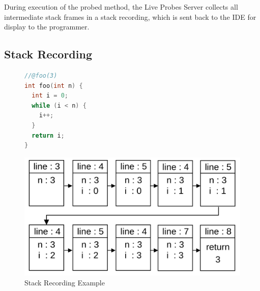 \documentclass[english,submission]{programming}
\begin{document}
During execution of the probed method, the Live Probes Server collects all intermediate stack frames in a stack recording, which is sent back to the IDE for display to the programmer. 

\subsection{Stack Recording}


\begin{figure}[h]
  \centering
  \begin{minipage}{0.25\textwidth}
    \centering
    \begin{lstlisting}[language=C]
//@foo(3)
int foo(int n) {
  int i = 0;
  while (i < n) {
    i++;
  }
  return i;
}
    \end{lstlisting}
  \end{minipage}
  \hfill
  \begin{minipage}{0.7\textwidth}
    \centering
    \includegraphics[width=0.8\linewidth]{img/stackrecording_chain.png}
  \end{minipage}
  \caption{Stack Recording Example}
  \label{fig:stack-recording}
\end{figure}

\end{document}
